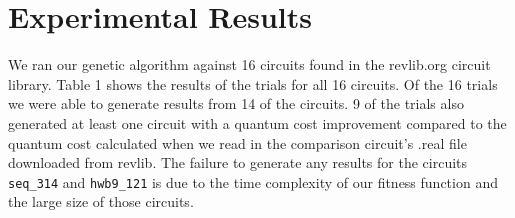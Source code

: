 \section{Experimental Results}

We ran our genetic algorithm against 16 circuits found in the revlib.org circuit library. Table 1 shows the results of the trials 
for all 16 circuits. Of the 16 trials we were able to generate results from 14 of the circuits. 9 of the trials also generated 
at least one circuit with a quantum cost improvement compared to the quantum cost calculated when we read in the comparison 
circuit's .real file downloaded from revlib. The failure to generate any results for the circuits \verb!seq_314! and
 \verb!hwb9_121! is due to the time complexity of our fitness function and the large size of those circuits. 

